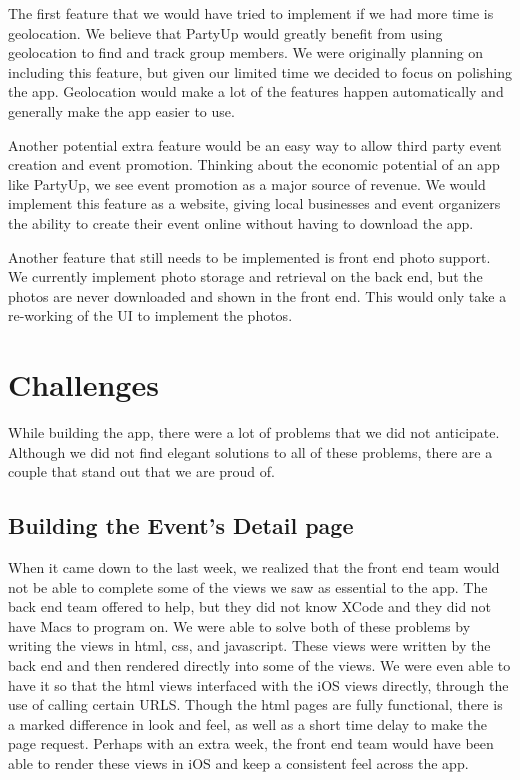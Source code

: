 \documentclass[12pt]{article}
\begin{document}
The first feature that we would have tried to implement if we had more time is geolocation.
We believe that PartyUp would greatly benefit from using geolocation to find and track group members.
We were originally planning on including this feature, but given our limited time we decided to focus on polishing the app. 
Geolocation would make a lot of the features happen automatically and generally make the app easier to use. 

Another potential extra feature would be an easy way to allow third party event creation and event promotion.
Thinking about the economic potential of an app like PartyUp, we see event promotion as a major source of revenue. 
We would implement this feature as a website, giving local businesses and event organizers the ability to create their event online without having to download the app.

Another feature that still needs to be implemented is front end photo support.
We currently implement photo storage and retrieval on the back end, but the photos are never downloaded and shown in the front end.
This would only take a re-working of the UI to implement the photos.

\section{Challenges}

While building the app, there were a lot of problems that we did not anticipate.
Although we did not find elegant solutions to all of these problems,
there are a couple that stand out that we are proud of.

\subsection{Building the Event's Detail page}

When it came down to the last week, we realized that the front end team would not be able to complete some of the views we saw as essential to the app. 
The back end team offered to help, but they did not know XCode and they did not have Macs to program on.
We were able to solve both of these problems by writing the views in  html, css, and javascript.
These views were written by the back end and then rendered directly into some of the views. 
We were even able to have it so that the html views interfaced with the iOS views directly, through the use of calling certain URLS. 
Though the html pages are fully functional, there is a marked difference in look and feel, as well as a short time delay to make the page request. 
Perhaps with an extra week, the front end team would have been able to render these views in iOS and keep a consistent feel across the app. 
\end{document}
